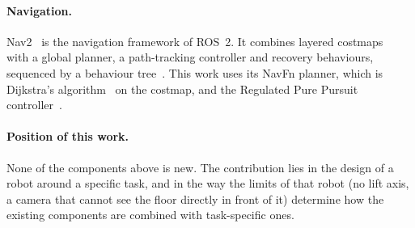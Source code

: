 \paragraph{Navigation.} Nav2~\cite{nav2} is the navigation framework of ROS~2. It combines layered
costmaps~\cite{costmap} with a global planner, a path-tracking controller and recovery
behaviours, sequenced by a behaviour tree~\cite{behaviortrees}. This work uses its NavFn
planner, which is Dijkstra's algorithm~\cite{dijkstra} on the costmap, and the Regulated
Pure Pursuit controller~\cite{rpp}.

\paragraph{Position of this work.} None of the components above is new. The contribution
lies in the design of a robot around a specific task, and in the way the limits of that
robot (no lift axis, a camera that cannot see the floor directly in front of it) determine
how the existing components are combined with task-specific ones.
